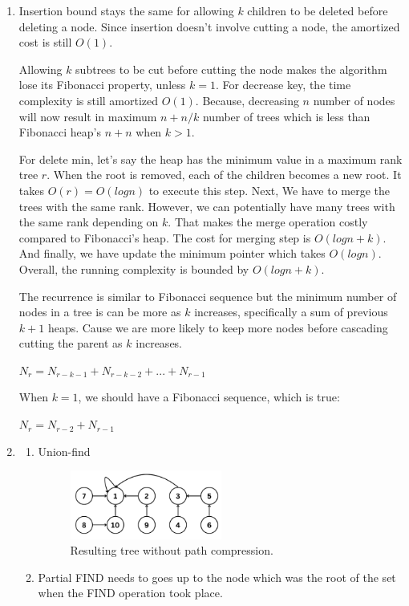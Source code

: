 \documentclass{article}
\begin{document}
\begin{enumerate}
  \item Insertion bound stays the same for allowing $k$ children to be deleted before deleting a node.
  Since insertion doesn't involve cutting a node, the amortized cost is still $O(1)$.
  
  Allowing $k$ subtrees to be cut before cutting the node makes the algorithm lose its Fibonacci property, unless $k=1$.
  For decrease key, the time complexity is still amortized $O(1)$. Because, decreasing $n$ number of nodes will now result in maximum $n+n/k$
  number of trees which is less than Fibonacci heap's $n+n$ when $k>1$.
  
  For delete min, let's say the heap has the minimum value in a maximum rank tree $r$. When the root is removed, each of the children becomes a new root.
  It takes $O(r)=O(logn)$ to execute this step. Next, We have to merge the trees with the same rank.
  However, we can potentially have many trees with the same rank depending on $k$. That makes the merge operation costly compared to Fibonacci's heap.
  The cost for merging step is $O(logn+k)$.
  And finally, we have update the minimum pointer which takes $O(logn)$. Overall, the running complexity is bounded by $O(logn+k)$.
  
  The recurrence is similar to Fibonacci sequence but the minimum number of nodes in a tree is can be more as $k$ increases, specifically a sum of previous $k+1$ heaps.
  Cause we are more likely to keep more nodes before cascading cutting the parent as $k$ increases.

  $N_r=N_{r-k-1}+N_{r-k-2}+...+N_{r-1}$

  When $k=1$, we should have a Fibonacci sequence, which is true:

  $N_r=N_{r-2}+N_{r-1}$

  \item
  \begin{enumerate}
    \item Union-find
    \begin{figure}[H]
      \centering
      \includegraphics[width=0.5\textwidth]{image2.png}
      \caption{Resulting tree without path compression.}
    \end{figure}
    \item Partial FIND needs to goes up to the node which was the root of the set when the FIND operation took place.\cite{master}


\end{enumerate}
\end{enumerate}
\end{document}
